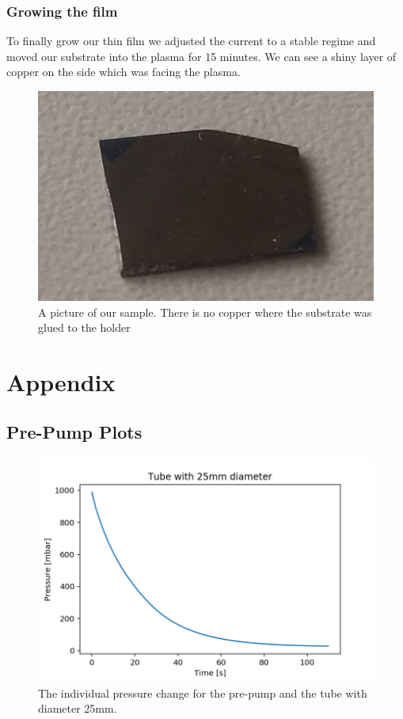 \documentclass[]{article}
\begin{document}
\subsubsection{Growing the film}
To finally grow our thin film we adjusted the current to a stable regime and moved our substrate into the plasma for 15 minutes. We can see a shiny layer of copper on the side which was facing the plasma.  

\begin{figure}
	\centering
	\includegraphics[width=0.7\linewidth]{Bilder/sample}
	\caption{A picture of our sample. There is no copper where the substrate was glued to the holder}
	\label{fig:sample}
\end{figure}
	


\newpage

\section{Appendix}
\subsection{Pre-Pump Plots}
\label{Pre-Pump Plots}

\begin{figure}[!h]
\centering\includegraphics[width=.5\textwidth]{Plots/25mm.png}
\caption{The individual pressure change for the pre-pump and the tube with diameter 25mm.}
\label{fig::25mm}
\end{figure}
\end{document}
